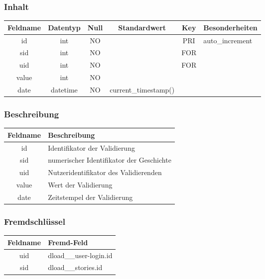 \subsubsection{Inhalt}
\begin{table}[H]
	\begin{tabular}{|c|c|c|c|c|p{3.5cm}|}
		\hline
		\textbf{Feldname} & \textbf{Datentyp} & \textbf{Null} & \textbf{Standardwert} & \textbf{Key}   & \textbf{Besonderheiten} \\ \hline
		id & int & NO &  & PRI & auto\_increment \\ \hline
		sid & int & NO &  & FOR & \\ \hline
		uid & int & NO &  & FOR & \\ \hline
		value & int & NO &  &  & \\ \hline
		date & datetime & NO & current\_timestamp() &  & \\ \hline
	\end{tabular}
\end{table}
\subsubsection{Beschreibung}
\begin{table}[H]
	\begin{tabular}{|c|p{12cm}|}
		\hline
		\textbf{Feldname} & \textbf{Beschreibung} \\ \hline
		id & Identifikator der Validierung \\ \hline
		sid & numerischer Identifikator der Geschichte \\ \hline
		uid & Nutzeridentifikator des Validierenden \\ \hline
		value & Wert der Validierung \\ \hline
		date & Zeitstempel der Validierung \\ \hline
	\end{tabular}
\end{table}
\subsubsection{Fremdschlüssel}
\begin{table}[H]
	\begin{tabular}{|c|p{12.5cm}|}
		\hline
		\textbf{Feldname} & \textbf{Fremd-Feld} \\ \hline
		uid & dload\_\_user-login.id \\ \hline
		sid & dload\_\_stories.id \\ \hline
	\end{tabular}
\end{table}
